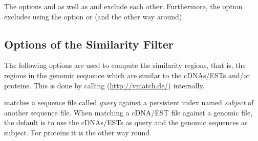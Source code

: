\documentclass[11pt,a4paper,titlepage]{article}
\begin{document}
The options  and  as well as  and  exclude each other.
Furthermore, the option  excludes using the
option  or  (and the other
way around).

\subsection{Options of the Similarity Filter}

The following options are used to compute the similarity regions, that is, the regions in the genomic sequence which are similar to the cDNAs/ESTs and/or proteins. This is done by calling \vmatch (\url{http://vmatch.de/}) internally.

\vmatch matches a sequence file called \emph{query} against a persistent index named \emph{subject} of another sequence file.
When matching a cDNA/EST file against a genomic file, the default is to use the cDNAs/ESTs as query and the genomic sequences as subject. For proteins it is the other way round.

\end{document}
